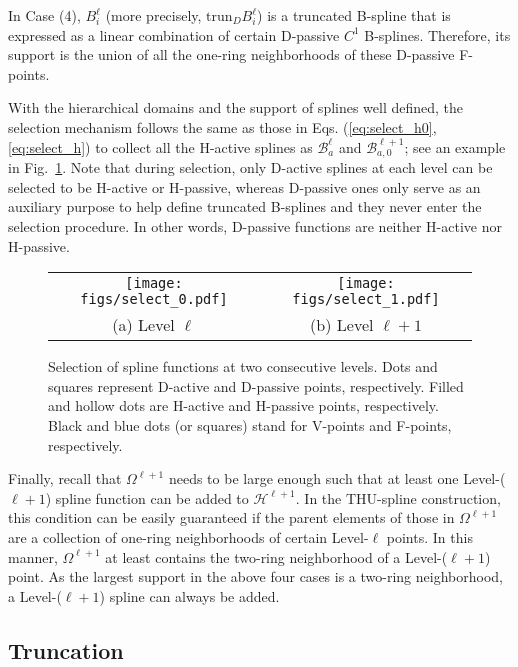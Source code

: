 \documentclass[graybox]{svmult}
\begin{document}
In Case (4), $B_i^\ell$ (more precisely, $\mathrm{trun}_D B_i^\ell$) is a truncated B-spline that is expressed as a linear combination of certain D-passive $C^1$ B-splines. Therefore, its support is the union of all the one-ring neighborhoods of these D-passive F-points.

With the hierarchical domains and the support of splines well defined, the selection mechanism follows the same as those in Eqs. (\ref{eq:select_h0}, \ref{eq:select_h}) to collect all the H-active splines as $\mathcal{B}_a^\ell$ and $\mathcal{B}_{a,0}^{\ell+1}$; see an example in Fig.~\ref{fig:select}. Note that during selection, only D-active splines at each level can be selected to be H-active or H-passive, whereas D-passive ones only serve as an auxiliary purpose to help define truncated B-splines and they never enter the selection procedure. In other words, D-passive functions are neither H-active nor H-passive.

\begin{figure}[htb]
\centering
\begin{tabular}{cc}
\texttt{[image: figs/select\_0.pdf]} & \hspace{+1mm}
\texttt{[image: figs/select\_1.pdf]} \\
(a) Level $\ell$ & (b) Level $\ell+1$ \\
\end{tabular}
\caption{Selection of spline functions at two consecutive levels. Dots and squares represent D-active and D-passive points, respectively. Filled and hollow dots are H-active and H-passive points, respectively. Black and blue dots (or squares) stand for V-points and F-points, respectively.}
\label{fig:select}
\end{figure}

Finally, recall that $\Omega^{\ell+1}$ needs to be large enough such that at least one Level-($\ell+1$) spline function can be added to $\mathcal{H}^{\ell+1}$. In the THU-spline construction, this condition can be easily guaranteed if the parent elements of those in $\Omega^{\ell+1}$ are a collection of one-ring neighborhoods of certain Level-$\ell$ points. In this manner, $\Omega^{\ell+1}$ at least contains the two-ring neighborhood of a Level-($\ell+1$) point. As the largest support in the above four cases is a two-ring neighborhood, a Level-($\ell+1$) spline can always be added.

\subsection{Truncation}
\end{document}
